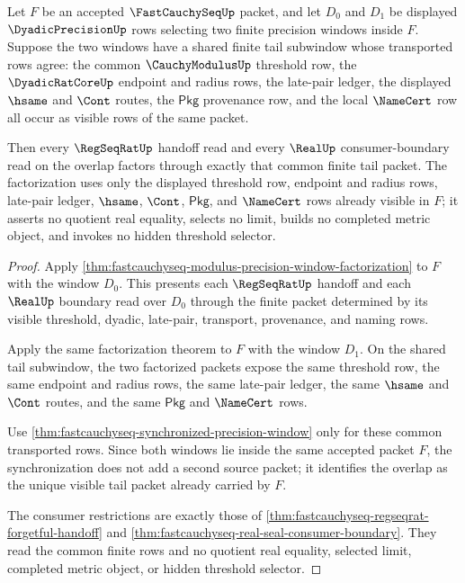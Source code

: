\begin{theorem}
\label{thm:fastcauchyseq-tail-window-overlap-exhaustion}
Let $F$ be an accepted $\FastCauchySeqUp$ packet, and let $D_0$ and $D_1$
be displayed $\DyadicPrecisionUp$ rows selecting two finite precision windows
inside $F$. Suppose the two windows have a shared finite tail subwindow whose
transported rows agree: the common $\CauchyModulusUp$ threshold row, the
$\DyadicRatCoreUp$ endpoint and radius rows, the late-pair ledger, the displayed
$\hsame$ and $\Cont$ routes, the $\mathsf{Pkg}$ provenance row, and the local
$\NameCert$ row all occur as visible rows of the same packet.

Then every $\RegSeqRatUp$ handoff read and every $\RealUp$ consumer-boundary
read on the overlap factors through exactly that common finite tail packet. The
factorization uses only the displayed threshold row, endpoint and radius rows,
late-pair ledger, $\hsame$, $\Cont$, $\mathsf{Pkg}$, and $\NameCert$ rows already
visible in $F$; it asserts no quotient real equality, selects no limit, builds
no completed metric object, and invokes no hidden threshold selector.
\end{theorem}
\begin{proof}
Apply \autoref{thm:fastcauchyseq-modulus-precision-window-factorization} to
$F$ with the window $D_0$. This presents each $\RegSeqRatUp$ handoff and each
$\RealUp$ boundary read over $D_0$ through the finite packet determined by its
visible threshold, dyadic, late-pair, transport, provenance, and naming rows.

Apply the same factorization theorem to $F$ with the window $D_1$. On the shared
tail subwindow, the two factorized packets expose the same threshold row, the
same endpoint and radius rows, the same late-pair ledger, the same $\hsame$ and
$\Cont$ routes, and the same $\mathsf{Pkg}$ and $\NameCert$ rows.

Use \autoref{thm:fastcauchyseq-synchronized-precision-window} only for these
common transported rows. Since both windows lie inside the same accepted packet
$F$, the synchronization does not add a second source packet; it identifies the
overlap as the unique visible tail packet already carried by $F$.

The consumer restrictions are exactly those of
\autoref{thm:fastcauchyseq-regseqrat-forgetful-handoff} and
\autoref{thm:fastcauchyseq-real-seal-consumer-boundary}. They read the common
finite rows and no quotient real equality, selected limit, completed metric
object, or hidden threshold selector.
\end{proof}

